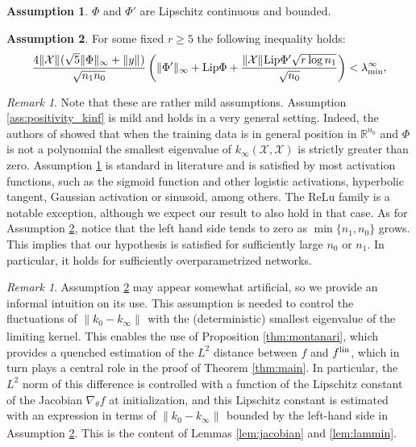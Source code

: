 \documentclass{article}
\theoremstyle{definition}
\newtheorem{ass}{Assumption}
\theoremstyle{remark}
\newtheorem{rem}[thm]{Remark}
\numberwithin{equation}{section}
\newcommand{\X}{\mathcal{X}}
\newcommand{\R}{\mathbb{R}}
\newcommand{\lin}{{\textup{lin}}}
\newcommand{\lammin}{\lambda_{\textup{min}}}
\newcommand{\norm}[2]{
    \|#1\|_{#2}
}
\begin{document}
\begin{ass}
    \label{ass:bounded}
    $\Phi$ and $\Phi'$ are Lipschitz continuous  and bounded.
\end{ass}
\begin{ass}
    \label{ass:r}
    For some fixed $r\ge 5$ the following inequality holds:
    \[
    \frac{4\norm{\X}{}(\sqrt 5\norm{\Phi}{\infty}+\norm{y}{})}{\sqrt{n_1n_0}}
        \left(\norm{\Phi'}{\infty} + \textup{Lip}\Phi + \frac{\norm{\X}{}\textup{Lip}\Phi'\sqrt{r \log n_1}}{\sqrt{n_0}}\right) < \lammin^\infty,
    \]
\end{ass}
\begin{rem}
    Note that these are rather mild assumptions.
    Assumption \ref{ass:positivity_kinf} is mild and holds in a very general setting.
    Indeed, the authors of \cite{carvalho2024} showed that when the training data is in general position in $\R^{n_0}$ and $\Phi$ is not a polynomial the smallest eigenvalue of $k_\infty(\X,\X)$ is strictly greater than zero.
Assumption \ref{ass:bounded} is standard in literature and is
 satisfied by most activation functions, such as the sigmoid function and other logistic activations, 
hyperbolic tangent, Gaussian activation or sinusoid, among others.
The ReLu family is a notable exception, although we expect our result to also hold in that case.
As for Assumption \ref{ass:r},
notice that the left hand side tends to zero as $\min\{n_1,n_0\}$ grows.
This implies that our hypothesis is satisfied for sufficiently large $n_0$ or $n_1$.
In particular, it holds for sufficiently overparametrized networks.
\end{rem}
\begin{rem}
    Assumption \ref{ass:r} may appear somewhat artificial, so we provide an informal intuition on its use.
    This assumption is needed to control the fluctuations of $\norm{k_0-k_\infty}{}$ with the (deterministic) smallest eigenvalue of the limiting kernel.
    This enables the use of Proposition \ref{thm:montanari}, which provides a quenched estimation of the $L^2$ distance between $f$ and $f^\lin$, which in turn plays a central role in the proof of Theorem \ref{thm:main}.
    In particular, the $L^2$ norm of this difference is controlled with a function of the Lipschitz constant of the Jacobian $\nabla_\theta f$ at initialization,
     and this Lipschitz constant is estimated with an expression in terms of  $\norm{k_0-k_\infty}{}$ bounded by the left-hand side in Assumption \ref{ass:r}.
    This is the content of Lemmas \ref{lem:jacobian} and \ref{lem:lammin}.
\end{rem}
\end{document}
